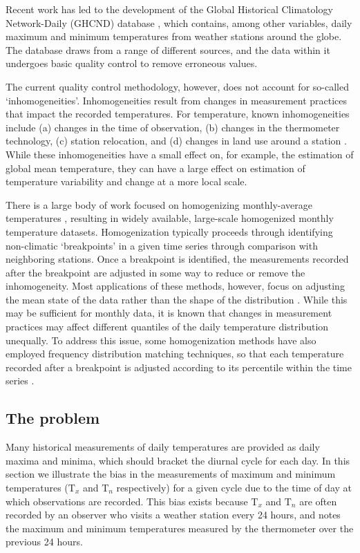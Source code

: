 \documentclass[letter]{article}
\newcommand{\T}{\mathrm{T}}
\newcommand{\Tn}{\T_{n}}
\newcommand{\Tx}{\T_{x}}
\begin{document}
Recent work has led to the development of the Global Historical Climatology Network-Daily (GHCND) database \citep{menne2012overview}, which contains, among other variables, daily maximum and minimum temperatures from weather stations around the globe. The database draws from a range of different sources, and the data within it undergoes basic quality control to remove erroneous values. 

The current quality control methodology, however, does not account for so-called `inhomogeneities'. Inhomogeneities result from changes in measurement practices that impact the recorded temperatures. For temperature, known inhomogeneities include (a) changes in the time of observation, (b) changes in the thermometer technology, (c) station relocation, and (d) changes in land use around a station \citep{menne2009us}. While these inhomogeneities have a small effect on, for example, the estimation of global mean temperature, they can have a large effect on estimation of temperature variability and change at a more local scale.

There is a large body of work focused on homogenizing monthly-average temperatures \citep[e.g.,][]{karl1986model, easterling1996development, peterson1998homogeneity, ducre2003comparison, menne2009homogenization, vincent2012second}, resulting in widely available, large-scale homogenized monthly temperature datasets. 
Homogenization typically proceeds through identifying non-climatic `breakpoints' in a given time series through comparison with neighboring stations.
Once a breakpoint is identified, the measurements recorded after the breakpoint are adjusted in some way to reduce or remove the inhomogeneity.
Most applications of these methods, however, focus on adjusting the mean state of the data rather than the shape of the distribution \citep[see][and references therein]{della2006method}.
While this may be sufficient for monthly data, it is known that changes in measurement practices may affect different quantiles of the daily temperature distribution unequally.
To address this issue, some homogenization methods have also employed frequency distribution matching techniques, so that each temperature recorded after a breakpoint is adjusted according to its percentile within the time series \citep{della2006method, trewin2013daily}. 

\subsection{The problem} 
\label{sec:illustrate_bias}
Many historical measurements of daily temperatures are provided as daily maxima and minima, which should bracket the diurnal cycle for each day. In this section we illustrate the bias in the measurements of maximum and minimum temperatures ($\Tx$ and $\Tn$ respectively) for a given cycle due to the time of day at which observations are recorded.  This bias exists because $\Tx$ and $\Tn$ are often recorded by an observer who visits a weather station every 24 hours, and notes the maximum and minimum temperatures measured by the thermometer over the previous 24 hours.
\end{document}
